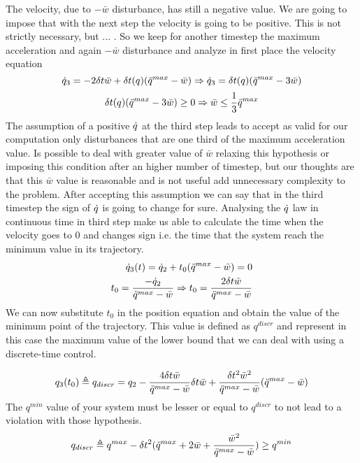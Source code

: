\documentclass{article}
\begin{document}
The velocity, due to $-\bar{w}$ disturbance, has still a negative value. We are going to impose that with the next step the velocity is going to be positive. This is not strictly necessary, but ... . So we keep for another timestep the maximum acceleration and again $-\bar{w}$ disturbance and analyze in first place the velocity equation
\begin{equation}
    \dot{q}_3 = -2 \delta t\bar{w}+ \delta t(q)(\ddot{q}^{max}-\bar{w}) \Rightarrow \dot{q}_3 =  \delta t(q)(\ddot{q}^{max}-3\bar{w}) 
\end{equation}
\begin{equation}
     \delta t(q)(\ddot{q}^{max}-3\bar{w}) \geq 0 \Rightarrow \bar{w}\leq \frac{1}{3}  \ddot{q}^{max}
     \label{eq:limited_alpha}
\end{equation}
The assumption of a positive $\dot{q}$ at the third step leads to accept as valid for our computation only disturbances that are one third of the maximum acceleration value. Is possible to deal with greater value of $\bar{w}$ relaxing this hypothesis or imposing this condition after an higher number of timestep, but our thoughts are that this $\bar{w}$ value is reasonable and is not useful add unnecessary complexity to the problem. 
After accepting this assumption we can say that in the third timestep the sign of $\dot{q}$ is going to change for sure. Analysing the $\dot{q}$ law in continuous time in third step make us able to calculate the time when the velocity goes to 0 and changes sign i.e. the time that the system reach the minimum value in its trajectory.
\begin{equation} \begin{aligned}
    \dot{q}_3(t) = \dot{q}_2+ t_0(\ddot{q}^{max}-\bar{w}) =0 \\
    t_0 = \frac{-\dot{q}_2}{\ddot{q}^{max}-\bar{w}} \Rightarrow t_0=\frac{2 \delta t \bar{w}}{\ddot{q}^{max}-\bar{w}}
    \label{eq:t0_third_step}
    \end{aligned}
\end{equation}
We can now substitute $t_0$ in the position equation and obtain the value of the minimum point of the trajectory. This value is defined as $q^{discr}$ and represent in this case the maximum value of the lower bound that we can deal with using a discrete-time control.

\begin{equation}
    q_3(t_0) \triangleq q_{discr} = q_2 - \frac{4\delta t\bar{w}}{\ddot{q}^{max}-\bar{w}}\delta t\bar{w} + \frac{\delta t^2\bar{w}^2}{\ddot{q}^{max}-\bar{w}}(\ddot{q}^{max}-\bar{w}) 
\end{equation}
 The $q^{min}$ value of your system must be lesser or equal to $q^{discr}$ to not lead to a violation with those hypothesis.
\begin{equation}
    q_{discr} \triangleq q^{max}-\delta t^2(\ddot{q}^{max}+2\bar{w}+\frac{\bar{w}^2}{\ddot{q}^{max}-\bar{w}}) \ge q^{min}
\end{equation}
\end{document}
